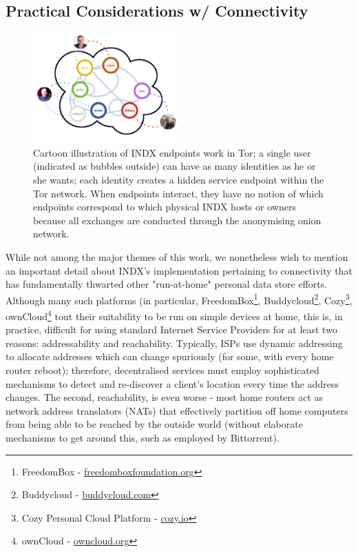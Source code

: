 \documentclass{sig-alternate}
\begin{document}
\subsection{Practical Considerations w/ Connectivity}

\begin{figure}[t!]
 	  \begin{center}
        \includegraphics[width=0.50\textwidth]{tor}
       \end{center}
    \caption{%
        Cartoon illustration of INDX endpoints work in Tor; a single user (indicated as bubbles outside) can have as many identities as he or she wants; each identity creates a hidden service endpoint within the Tor network. When endpoints interact, they have no notion of which endpoints correspond to which physical INDX hosts or owners because all exchanges are conducted through the anonymising onion network.
    }%
  \label{fig:tor}
\end{figure}


While not among the major themes of this work, we nonetheless wish to mention an important detail about INDX's implementation pertaining to connectivity that has fundamentally thwarted other "run-at-home" personal data store efforts.  Although many such platforms (in particular, FreedomBox\footnote{FreedomBox - \url{freedomboxfoundation.org}}, Buddycloud\footnote{Buddycloud - \url{buddycloud.com}}, Cozy\footnote{Cozy Personal Cloud Platform - \url{cozy.io}}, ownCloud\footnote{ownCloud - \url{owncloud.org}} tout their suitability to be run on simple devices at home, this is, in practice, difficult for using standard Internet Service Providers for at least two reasons: addressability and reachability.  Typically, ISPs use dynamic addressing to allocate addresses which can change spuriously (for some, with every home router reboot); therefore, decentralised services must employ sophisticated mechanisms to detect and re-discover a client's location every time the address changes.  The second, reachability, is even worse - most home routers act as network address translators (NATs) that effectively partition off home computers from being able to be reached by the outside world (without elaborate mechanisms to get around this, such as employed by Bittorrent).
\end{document}
